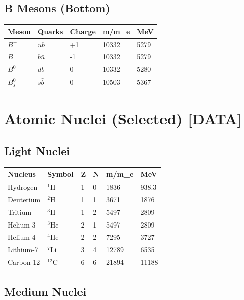 \documentclass[
  11pt,
  letterpaper,
  twoside,
  openany]{book}
\makeatletter
\let\orig@section\section
\renewcommand{\section}{\needspace{8\baselineskip}\orig@section}
\let\orig@subsection\subsection
\renewcommand{\subsection}{\needspace{6\baselineskip}\orig@subsection}
\makeatother
\begin{document}
\subsection{B Mesons (Bottom)}\label{b-mesons-bottom}

\begin{longtable}[]{@{}lllll@{}}
\toprule\noalign{}
Meson & Quarks & Charge & m/m\_e & MeV \\
\midrule\noalign{}
\endhead
\bottomrule\noalign{}
\endlastfoot
\(B^+\) & \(u\bar{b}\) & +1 & 10332 & 5279 \\
\(B^-\) & \(b\bar{u}\) & -1 & 10332 & 5279 \\
\(B^0\) & \(d\bar{b}\) & 0 & 10332 & 5280 \\
\(B_s^0\) & \(s\bar{b}\) & 0 & 10503 & 5367 \\
\end{longtable}

\section{Atomic Nuclei (Selected)
{[}DATA{]}}\label{atomic-nuclei-selected-data}

\subsection{Light Nuclei}\label{light-nuclei}

\begin{longtable}[]{@{}llllll@{}}
\toprule\noalign{}
Nucleus & Symbol & Z & N & m/m\_e & MeV \\
\midrule\noalign{}
\endhead
\bottomrule\noalign{}
\endlastfoot
Hydrogen & \(^1\)H & 1 & 0 & 1836 & 938.3 \\
Deuterium & \(^2\)H & 1 & 1 & 3671 & 1876 \\
Tritium & \(^3\)H & 1 & 2 & 5497 & 2809 \\
Helium-3 & \(^3\)He & 2 & 1 & 5497 & 2809 \\
Helium-4 & \(^4\)He & 2 & 2 & 7295 & 3727 \\
Lithium-7 & \(^7\)Li & 3 & 4 & 12789 & 6535 \\
Carbon-12 & \(^{12}\)C & 6 & 6 & 21894 & 11188 \\
\end{longtable}

\subsection{Medium Nuclei}\label{medium-nuclei}
\end{document}
